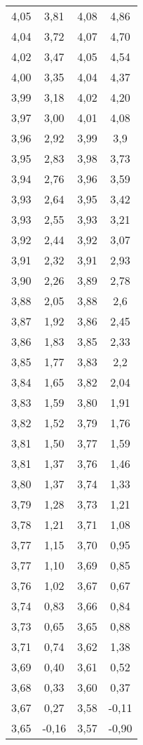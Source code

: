 \begin{longtable}{c c || c c}
4,05 &       3,81 &  4,08 &        4,86 \\
4,04 &       3,72 &  4,07 &        4,70  \\
4,02 &       3,47 &  4,05 &        4,54 \\
4,00   &      3,35 &  4,04 &        4,37 \\
3,99 &       3,18 &  4,02 &        4,20  \\
3,97 &       3,00    &  4,01 &      4,08 \\
3,96 &       2,92 &  3,99 &        3,9  \\
3,95 &       2,83 &  3,98 &        3,73 \\
3,94 &       2,76 &  3,96 &        3,59 \\
3,93 &       2,64 &  3,95 &        3,42 \\
3,93 &       2,55 &  3,93 &        3,21 \\
3,92 &       2,44 &  3,92 &        3,07 \\
3,91 &       2,32 &  3,91 &        2,93 \\
3,90  &       2,26 &  3,89 &        2,78 \\
3,88 &       2,05 &  3,88 &        2,6  \\
3,87 &       1,92 &  3,86 &        2,45 \\
3,86 &       1,83 &  3,85 &        2,33 \\
3,85 &       1,77 &  3,83 &        2,2  \\
3,84 &       1,65 &  3,82 &        2,04 \\
3,83 &       1,59 &  3,80  &        1,91 \\
3,82 &       1,52 &  3,79 &        1,76 \\
3,81 &       1,50  &  3,77 &        1,59 \\
3,81 &       1,37 &  3,76 &        1,46 \\
3,80  &       1,37 &  3,74 &        1,33 \\
3,79 &       1,28 &  3,73 &        1,21 \\
3,78 &       1,21 &  3,71 &        1,08 \\
3,77 &       1,15 &  3,70  &        0,95 \\
3,77 &       1,10  &  3,69 &        0,85 \\
3,76 &       1,02 &  3,67 &        0,67 \\
3,74 &       0,83 &  3,66 &        0,84 \\
3,73 &       0,65 &  3,65 &        0,88 \\
3,71 &       0,74 &  3,62 &        1,38 \\
3,69 &       0,40  &  3,61 &        0,52 \\
3,68 &       0,33 &  3,60  &        0,37 \\
3,67 &       0,27 &  3,58 &       -0,11 \\
3,65 &      -0,16 &  3,57 &       -0,90  \\
\end{longtable}
